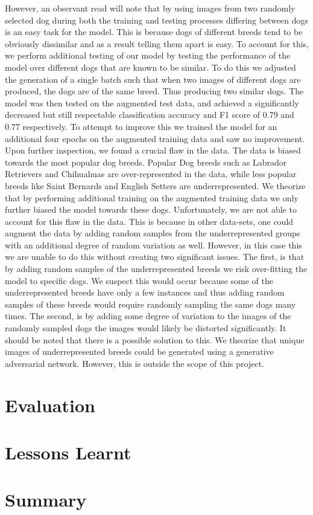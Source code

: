 \documentclass{article}
\begin{document}
However, an observant read will note that by using images from two randomly selected dog during both the training and testing processes differing between dogs is an easy task for the model.  This is because dogs of different breeds tend to be obviously dissimilar and as a result telling them apart is easy.  To account for this, we perform additional testing of our model by testing the performance of the model over different dogs that are known to be similar.  To do this we adjusted the generation of a single batch such that when two images of different dogs are produced, the dogs are of the same breed.  Thus producing two similar dogs.  The model was then tested on the augmented test data, and achieved a significantly decreased but still respectable classification accuracy and F1 score of 0.79 and 0.77 respectively.   To attempt to improve this we trained the model for an additional four epochs on the augmented training data and saw no improvement.  Upon further inspection, we found a crucial flaw in the data.  The data is biased towards the most popular dog breeds.  Popular Dog breeds such as Labrador Retrievers and Chihuahuas are over-represented in the data, while less popular breeds like Saint Bernards and English Setters are underrepresented.  We theorize that by performing additional training on the augmented training data we only further biased the model towards these dogs.  Unfortunately, we are not able to account for this flaw in the data.  This is because in other data-sets, one could augment the data by adding random samples from the underrepresented groups with an additional degree of random variation as well.  However, in this case this we are unable to do this without creating two significant issues.  The first, is that by adding random samples of the underrepresented breeds we risk over-fitting the model to specific dogs.  We suspect this would occur because some of the underrepresented breeds have only a few instances and thus adding random samples of these breeds would require randomly sampling the same dogs many times.  The second, is by adding some degree of variation to the images of the randomly sampled dogs the images would likely be distorted significantly.  It should be noted that there is a possible solution to this.  We theorize that unique images of underrepresented breeds could be generated using a generative adversarial network.  However, this is outside the scope of this project.

\section{Evaluation}

\section{Lessons Learnt}

\section{Summary}
\end{document}
